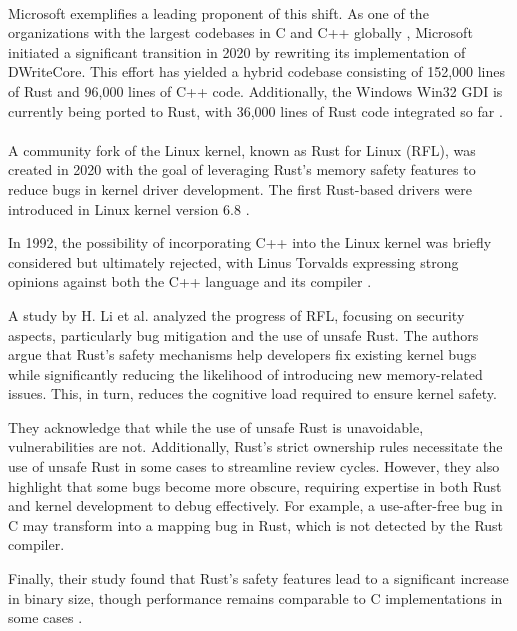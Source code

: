 \paragraph{}

Microsoft exemplifies a leading proponent of this shift. As one of the organizations with the largest codebases in C and C++ globally \cite[]{2022ReviewAdoption}, Microsoft initiated a significant transition in 2020 by rewriting its implementation of DWriteCore. This effort has yielded a hybrid codebase consisting of 152,000 lines of Rust and 96,000 lines of C++ code. Additionally, the Windows Win32 GDI is currently being ported to Rust, with 36,000 lines of Rust code integrated so far \cite[]{claburnMicrosoftRewritingCore}.

\paragraph{}

A community fork of the Linux kernel, known as Rust for Linux (RFL), was created in 2020 with the goal of leveraging Rust's memory safety features to reduce bugs in kernel driver development. The first Rust-based drivers were introduced in Linux kernel version 6.8 \cite[]{EmpiricalStudyRustforLinux2024}.

In 1992, the possibility of incorporating C++ into the Linux kernel was briefly considered but ultimately rejected, with Linus Torvalds expressing strong opinions against both the C++ language and its compiler \cite[]{LinusTorvalds}.

A study by H. Li et al. \cite[]{EmpiricalStudyRustforLinux2024} analyzed the progress of RFL, focusing on security aspects, particularly bug mitigation and the use of unsafe Rust. The authors argue that Rust’s safety mechanisms help developers fix existing kernel bugs while significantly reducing the likelihood of introducing new memory-related issues. This, in turn, reduces the cognitive load required to ensure kernel safety.

They acknowledge that while the use of unsafe Rust is unavoidable, vulnerabilities are not. Additionally, Rust's strict ownership rules necessitate the use of unsafe Rust in some cases to streamline review cycles. However, they also highlight that some bugs become more obscure, requiring expertise in both Rust and kernel development to debug effectively. For example, a use-after-free bug in C may transform into a mapping bug in Rust, which is not detected by the Rust compiler.

Finally, their study found that Rust’s safety features lead to a significant increase in binary size, though performance remains comparable to C implementations in some cases \cite[]{EmpiricalStudyRustforLinux2024}.